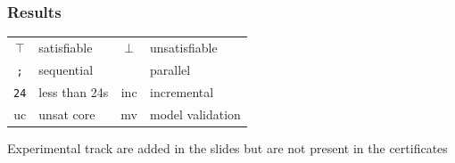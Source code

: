 \documentclass[table]{beamer}
\begin{document}
\newcommand{\seq}{\texttt{;}}
\newcommand{\paral}{\textbardbl}
\newcommand{\sat}{$\top$}
\newcommand{\unsat}{$\bot$}
\newcommand{\fast}{\texttt{24}}
\newcommand{\inc}{inc}
\newcommand{\uc}{uc}
\newcommand{\mv}{mv}
\newcommand{\cloud}{cloud}
\newcommand{\paralTrack}{parallel}

\begin{frame}
  \frametitle{Results}
  \begin{center}
    \begin{tabular}{|cl|cl|}
  \hline
  \sat & satisfiable & \unsat & unsatisfiable \\
  \seq & sequential & \paral & parallel \\
  \fast & less than 24s & \inc & incremental \\
  \uc & unsat core & \mv & model validation \\
  \hline
\end{tabular}
\end{center}
\vfill
Experimental track are added in the slides but are not present
in the certificates
\end{frame}

{
  \newcommand{\withtrack}[2]{\textsc{#1}{{\footnotesize (#2)}}}
  
\def\newpage{}

\newcommand{\MakeOnePage}[6]{
    \begin{frame}
    \frametitle{#1}
        
    \medskip
    \ifstrempty{#2}{}{
    \textcolor{red!30!black!90}
    {\textit{Overall Winner}}
    
    
    \textcolor{black}{\large #2}
    
     \medskip
    }

    \ifstrempty{#3}{}{
    \textcolor{red!30!black!90} {\textit{Winner of the Division#5}}
    
     \textcolor{black}{\large#3}
    
     \medskip
    }

    \ifstrempty{#4}{}{
     \textcolor{red!30!black!90}  {\textit{Winner of the Logic#6
      \ifstrempty{#3}{}{(where it did not win the corresponding division)}}}
     
     \textcolor{black}{\large #4}
    }
    \vspace{2mm}
    \end{frame}
}




}
\end{document}
